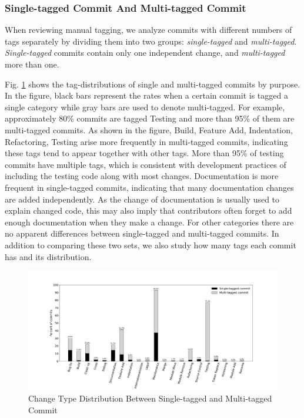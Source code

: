 \subsubsection{Single-tagged Commit And Multi-tagged Commit}

When reviewing manual tagging, we analyze commits with different numbers of tags separately by dividing 
them into two groups: \textit{single-tagged} and \textit{multi-tagged}. \textit{Single-tagged} commits contain only one independent change, and \textit{multi-tagged} more than one. 

Fig. \ref{fig: cat_distribution} shows the tag-distributions of single and multi-tagged commits by purpose.
In the figure, black bars represent the rates when a certain commit is tagged a single category while gray bars are used to denote multi-tagged. For example, approximately 80\% commits are tagged Testing and more than 95\% of them are multi-tagged commits.
As shown in the figure, Build, Feature Add, Indentation, Refactoring, Testing arise more frequently in multi-tagged commits, indicating these tags tend to appear together with other tags. 
More than 95\% of testing commits have multiple tags, which is consistent with development practices of including the testing code along with most changes.
Documentation is more frequent in single-tagged commits, indicating that many documentation changes are added independently.
As the change of documentation is usually used to explain changed code, this may also imply that contributors often forget to add enough documentation when they make a change.
For other categories there are no apparent differences between single-tagged and multi-tagged commits.
In addition to comparing these two sets, we also study how many tags each commit has and its distribution. 
\begin{figure}[htbp]
\centerline{\includegraphics[scale=0.30]{figures/cat_distribution_over_s&m_commits.pdf}}
\caption{Change Type Distribution Between Single-tagged and Multi-tagged Commit}
\label{fig: cat_distribution}
\end{figure}

